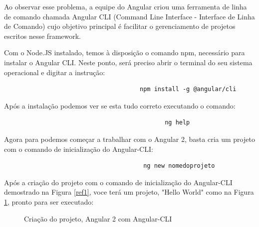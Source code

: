 \documentclass[12pt]{article}
\begin{document}
Ao observar esse problema, a equipe do Angular criou uma ferramenta de linha de comando chamada Angular CLI (Command Line Interface - Interface de Linha de Comando) cujo objetivo principal é facilitar o gerenciamento de projetos escritos nesse framework.

Com o Node.JS instalado, temos à disposição o comando npm, necessário para instalar o Angular CLI. Neste ponto, será preciso abrir o terminal do seu sistema operacional e digitar a instrução:
\begin{verbatim}
	                                  npm install -g @angular/cli
\end{verbatim}

Após a instalação podemos ver se esta tudo correto executando o comando:

\begin{verbatim}
                                             ng help
\end{verbatim}

Agora para podemos começar a trabalhar com o Angular 2, basta cria um projeto com o comando de inicialização do Angular-CLI: 


\begin{verbatim}
                                       ng new nomedoprojeto
\end{verbatim}

Após a criação do projeto com o comando de inicialização do Angular-CLI demostrado na Figura \ref{ref1}, voce terá um projeto,  "Hello World" como na Figura \ref{ref2}, pronto para ser executado:

\begin{figure}[H]
	
	\center
	\label{ref1}
	\qquad
	\label{ref2}
	\caption{Criação do projeto, Angular 2  com Angular-CLI }
	
\end{figure}


\end{document}
